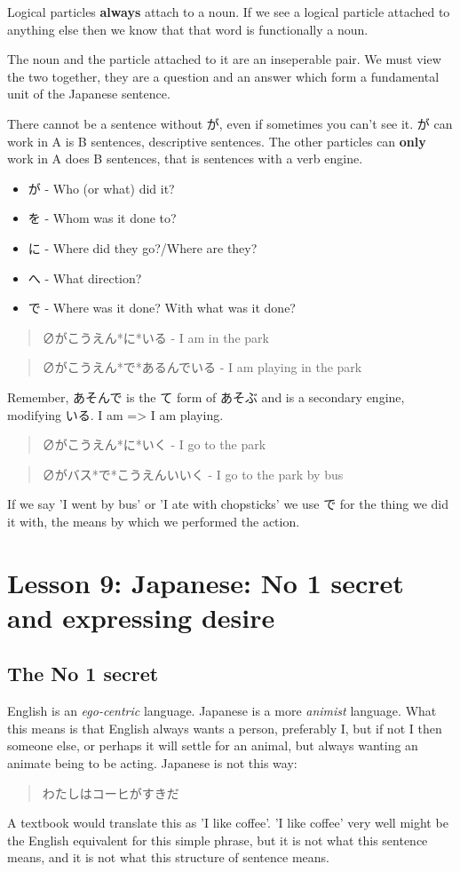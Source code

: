 \documentclass[11pt]{article}
\begin{document}
Logical particles \textbf{always} attach to a noun. If we see a logical particle attached to anything else then we know that that word is functionally a noun.

The noun and the particle attached to it are an inseperable pair. We must view the two together, they are a question and an answer which form a fundamental unit of the Japanese sentence.

There cannot be a sentence without が, even if sometimes you can't see it. が can work in A is B sentences, descriptive sentences. The other particles can \textbf{only} work in A does B sentences, that is sentences with a verb engine.
\begin{itemize}
\item が - Who (or what) did it?
\item を - Whom was it done to?
\item に - Where did they go?/Where are they?
\item へ - What direction?
\item で - Where was it done? With what was it done?
\end{itemize}
\begin{quote}
∅がこうえん*に*いる - I am in the park
\end{quote}
\begin{quote}
∅がこうえん*で*あるんでいる - I am playing in the park
\end{quote}
Remember, あそんで is the て form of あそぶ and is a secondary engine, modifying いる. I am => I am playing.
\begin{quote}
∅がこうえん*に*いく - I go to the park
\end{quote}
\begin{quote}
∅がバス*で*こうえんいいく - I go to the park by bus
\end{quote}
If we say 'I went by bus' or 'I ate with chopsticks' we use で for the thing we did it with, the means by which we performed the action.
\section{Lesson 9: Japanese: No 1 secret and expressing desire}
\label{sec:orgc620cc8}
\subsection{The No 1 secret}
\label{sec:org0fe70a6}
English is an \emph{ego-centric} language. Japanese is a more \emph{animist} language. What this means is that English always wants a person, preferably I, but if not I then someone else, or perhaps it will settle for an animal, but always wanting an animate being to be acting. Japanese is not this way:
\begin{quote}
わたしはコーヒがすきだ
\end{quote}
A textbook would translate this as 'I like coffee'. 'I like coffee' very well might be the English equivalent for this simple phrase, but it is not what this sentence means, and it is not what this structure of sentence means.
\end{document}
